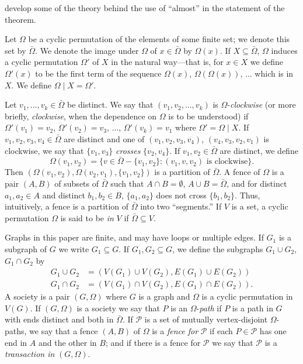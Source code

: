\noindent develop some of the theory behind the use of ``almost'' in the statement of the theorem.

Let $\Omega$ be a cyclic permutation of the elements of some finite set; we denote this set by $\bar{\Omega}$. We denote the image under $\Omega$ of $x \in \bar{\Omega}$ by $\Omega(x)$. If $X \subseteq \bar{\Omega}$, $\Omega$ induces a cyclic permutation $\Omega'$ of $X$ in the natural way---that is, for $x \in X$ we define $\Omega'(x)$ to be the first term of the sequence $\Omega(x)$, $\Omega(\Omega(x))$, ... which is in $X$. We define $\Omega \mid X = \Omega'$.

Let $v_1, ..., v_k \in \bar{\Omega}$ be distinct. We say that $(v_1, v_2, ..., v_k)$ is $\Omega$-\textit{clockwise} (or more briefly, \textit{clockwise}, when the dependence on $\Omega$ is to be understood) if $\Omega'(v_1) = v_2$, $\Omega'(v_2) = v_3$, ..., $\Omega'(v_k) = v_1$ where $\Omega' = \Omega \mid X$. If $v_1, v_2, v_3, v_4 \in \bar{\Omega}$ are distinct and one of $(v_1, v_2, v_3, v_4)$, $(v_4, v_3, v_2, v_1)$ is clockwise, we say that $\{v_1, v_3\}$ \textit{crosses} $\{v_2, v_4\}$. If $v_1, v_2 \in \bar{\Omega}$ are distinct, we define
\begin{equation*}
\Omega(v_1, v_2) = \{v \in \bar{\Omega} - \{v_1, v_2\} : (v_1, v, v_2) \text{ is clockwise}\}.
\end{equation*}
Then $(\Omega(v_1, v_2), \Omega(v_2, v_1), \{v_1, v_2\})$ is a partition of $\bar{\Omega}$. A fence of $\Omega$ is a pair $(A, B)$ of subsets of $\bar{\Omega}$ such that $A \cap B = \emptyset$, $A \cup B = \bar{\Omega}$, and for distinct $a_1, a_2 \in A$ and distinct $b_1, b_2 \in B$, $\{a_1, a_2\}$ does not cross $\{b_1, b_2\}$. Thus, intuitively, a fence is a partition of $\bar{\Omega}$ into two ``segments.'' If $V$ is a set, a cyclic permutation $\Omega$ is said to be \textit{in} $V$ if $\bar{\Omega} \subseteq V$.

Graphs in this paper are finite, and may have loops or multiple edges. If $G_1$ is a subgraph of $G$ we write $G_1 \subseteq G$. If $G_1, G_2 \subseteq G$, we define the subgraphs $G_1 \cup G_2$, $G_1 \cap G_2$ by
\begin{align*}
G_1 \cup G_2 &= (V(G_1) \cup V(G_2), E(G_1) \cup E(G_2)) \\
G_1 \cap G_2 &= (V(G_1) \cap V(G_2), E(G_1) \cap E(G_2)).
\end{align*}
A society is a pair $(G, \Omega)$ where $G$ is a graph and $\Omega$ is a cyclic permutation in $V(G)$. If $(G, \Omega)$ is a society we say that $P$ is an $\Omega$-\textit{path} if $P$ is a path in $G$ with ends distinct and both in $\bar{\Omega}$. If $\mathcal{P}$ is a set of mutually vertex-disjoint $\Omega$-paths, we say that a fence $(A, B)$ of $\Omega$ is a \textit{fence for} $\mathcal{P}$ if each $P \in \mathcal{P}$ has one end in $A$ and the other in $B$; and if there is a fence for $\mathcal{P}$ we say that $\mathcal{P}$ is a \textit{transaction in} $(G, \Omega)$.

